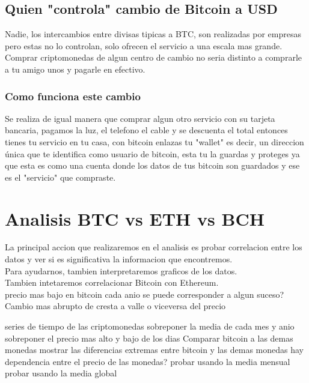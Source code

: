 \documentclass[12pt,letterpaper]{article}
\begin{document}
	\subsection*{Quien "controla" cambio de Bitcoin a USD}
	Nadie, los intercambios entre divisas tipicas a BTC, son realizadas por empresas pero estas no lo controlan, solo ofrecen el servicio a una escala mas grande. Comprar criptomonedas de algun centro de cambio no seria distinto a comprarle a tu amigo unos y pagarle en efectivo.
		\subsubsection*{Como funciona este cambio}
        Se realiza de igual manera que comprar algun otro servicio con su tarjeta bancaria, pagamos la luz, el telefono el cable y se descuenta el total entonces tienes tu servicio en tu casa, con bitcoin enlazas tu "wallet" es decir, un direccion \'unica que te identifica como usuario de bitcoin, esta tu la guardas y proteges ya que esta es como una cuenta donde los datos de tus bitcoin son guardados y ese es el "servicio" que compraste.
        

\section*{Analisis BTC vs ETH vs BCH}
    La principal accion que realizaremos en el analisis es probar correlacion entre los datos y ver si es significativa la informacion que encontremos.
    \\
    Para ayudarnos, tambien interpretaremos graficos de los datos.
    \\
    Tambien intetaremos correlacionar Bitcoin con Ethereum.
    \\
    precio mas bajo en bitcoin cada anio
        se puede corresponder a algun suceso?
    Cambio mas abrupto de cresta a valle o viceversa del precio

    series de tiempo de las criptomonedas
        sobreponer la media de cada mes y anio
    sobreponer el precio mas alto y bajo de los dias
    Comparar bitcoin a las demas monedas
        mostrar las diferencias extremas entre bitcoin y las demas monedas
    hay dependencia entre el precio de las monedas?
        probar usando la media mensual
        probar usando la media global
\end{document}
